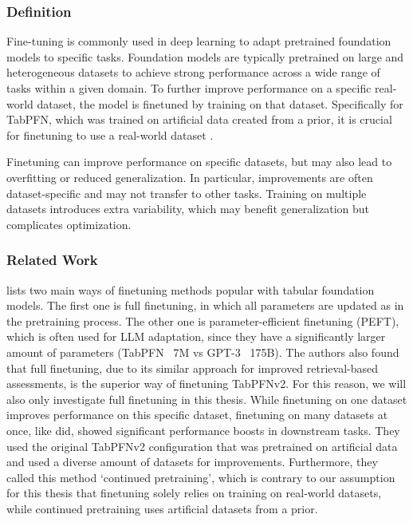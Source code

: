 \subsubsection{Definition}
Fine-tuning is commonly used in deep learning to adapt pretrained foundation models to specific tasks.
\newline
Foundation models are typically pretrained on large and heterogeneous datasets to achieve strong performance across a wide range of tasks within a given domain.
To further improve performance on a specific real-world dataset, the model is finetuned by training on that dataset.
\newline
Specifically for TabPFN, which was trained on artificial data created from a prior, it is crucial for finetuning to use a real-world dataset \citep{rubachev2025finetuning}.

Finetuning can improve performance on specific datasets, but may also lead to overfitting or reduced generalization.
In particular, improvements are often dataset-specific and may not transfer to other tasks.
Training on multiple datasets introduces extra variability, which may benefit generalization but complicates optimization.
\subsubsection{Related Work}
\citet{rubachev2025finetuning} lists two main ways of finetuning methods popular with tabular foundation models.
The first one is full finetuning, in which all parameters are updated as in the pretraining process.
The other one is parameter-efficient finetuning (PEFT), which is often used for LLM adaptation, since they have a significantly larger amount of parameters (TabPFN ~7M vs GPT-3 ~175B)\citep{brown2020language, hollmann2025accurate}.
The authors also found that full finetuning, due to its similar approach for improved retrieval-based assessments, is the superior way of finetuning TabPFNv2.
For this reason, we will also only investigate full finetuning in this thesis.\newline
While finetuning on one dataset improves performance on this specific dataset, finetuning on many datasets at once, like \citet{Hollmann_2025} did, showed significant performance boosts in downstream tasks.
They used the original TabPFNv2 configuration that was pretrained on artificial data and used a diverse amount of datasets for improvements.
Furthermore, they called this method `continued pretraining’, which is contrary to our assumption for this thesis that finetuning solely relies on training on real-world datasets, while continued pretraining uses artificial datasets from a prior.

